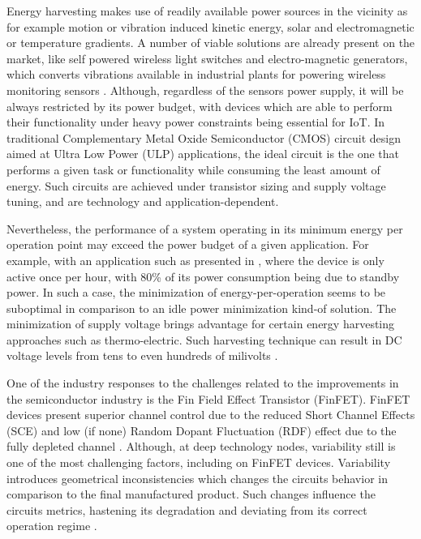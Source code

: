 \documentclass[pgmicro,mestrado,english]{iiufrgs}
\begin{document}
    Energy harvesting makes use of readily available power sources in the vicinity as for example motion or vibration induced kinetic energy, solar and electromagnetic or temperature gradients. A number of viable solutions are already present on the market, like self powered wireless light switches and electro-magnetic generators, which converts vibrations available in industrial plants for powering wireless monitoring sensors \cite{manoli2010energy} \cite{bleitner2018comparison}. Although, regardless of the sensors power supply, it will be always restricted by its power budget, with devices which are able to perform their functionality under heavy power constraints being essential for IoT. In traditional Complementary Metal Oxide Semiconductor (CMOS) circuit design aimed at Ultra Low Power (ULP) applications, the ideal circuit is the one that performs a given task or functionality while consuming the least amount of energy. Such circuits are achieved under transistor sizing and supply voltage tuning, and are technology and application-dependent.

    Nevertheless, the performance of a system operating in its minimum energy per operation point may exceed the power budget of a given application. For example, with an application such as presented in \cite{fojtik2013millimeter}, where the device is only active once per hour, with 80\% of its power consumption being due to standby power. In such a case, the minimization of energy-per-operation seems to be suboptimal in comparison to an idle power minimization kind-of solution. The minimization of supply voltage brings advantage for certain energy harvesting approaches such as thermo-electric. Such harvesting technique can result in DC voltage levels from tens to even hundreds of milivolts \cite{khan2014flexible}.

    One of the industry responses to the challenges related to the improvements in the semiconductor industry is the Fin Field Effect Transistor (FinFET). FinFET devices present superior channel control due to the reduced Short Channel Effects (SCE) and low (if none) Random Dopant Fluctuation (RDF) effect due to the fully depleted channel \cite{farkhani2014comparative}. Although, at deep technology nodes, variability still is one of the most challenging factors, including on FinFET devices. Variability introduces geometrical inconsistencies which changes the circuits behavior in comparison to the final manufactured product. Such changes influence the circuits metrics, hastening its degradation and deviating from its correct operation regime \cite{abbas:15} \cite{nassif:08}.
\end{document}
